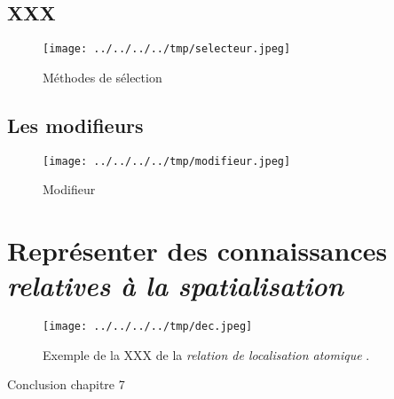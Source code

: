 \subsection{XXX}

\begin{figure}
  \centering
  \texttt{[image: ../../../../tmp/selecteur.jpeg]}
  \caption{Méthodes de sélection}
  \label{fig:methode_selecteur}
\end{figure}





\subsection{Les modifieurs}



\begin{figure}
  \centering
  \texttt{[image: ../../../../tmp/modifieur.jpeg]}
  \caption{Modifieur}
  \label{fig:methode_modifieur}
\end{figure}


\section{Représenter des connaissances \emph{relatives à la spatialisation}}


\begin{figure}
  \centering
  \texttt{[image: ../../../../tmp/dec.jpeg]}
  \caption{Exemple de la XXX de la \emph{relation de localisation
      atomique} \protect{}.}
  \label{fig:methode_selecteur}
\end{figure}



Conclusion chapitre 7
